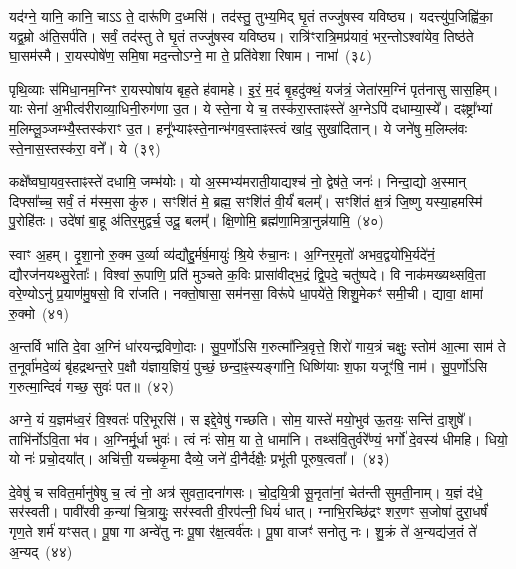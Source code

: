 यद॑ग्ने॒ यानि॒ कानि॒ चाऽऽ ते॒ दारू॑णि द॒ध्मसि॑। तद॑स्तु॒ तुभ्य॒मिद् घृ॒तं तज्जु॑षस्व यविष्ठ्य। यदत्त्यु॑प॒जिह्वि॑का॒ यद्व॒म्रो अ॑ति॒सर्प॑ति। सर्वं॒ तद॑स्तु ते घृ॒तं तज्जु॑षस्व यविष्ठ्य। रात्रि॑ꣳरात्रि॒मप्र॑यावं॒ भर॒न्तो\-ऽश्वा॑येव॒ तिष्ठ॑ते घा॒सम॑स्मै। रा॒यस्पोषे॑ण॒ समि॒षा मद॒न्तो\-ऽग्ने॒ मा ते॒ प्रति॑वेशा रिषाम। नाभा॑~(३८)

पृथि॒व्याः स॑मिधा॒नम॒ग्निꣳ रा॒यस्पोषा॑य बृह॒ते ह॑वामहे। इ॒रं॒ म॒दं बृ॒हदु॑क्थं॒ यज॑त्रं॒ जेता॑रम॒ग्निं पृत॑नासु सास॒हिम्। याः सेना॑ अ॒भीत्व॑रीराव्या॒धिनी॒रुग॑णा उ॒त। ये स्ते॒ना ये च॒ तस्क॑रा॒स्ताꣴस्ते॑ अ॒ग्ने\-ऽपि॑ दधाम्या॒स्ये᳚। दꣴष्ट्रा᳚भ्यां म॒लिम्लू॒ञ्जम्भ्यै॒स्तस्क॑राꣳ उ॒त। हनू᳚भ्याꣴस्ते॒नान्भ॑गव॒स्ताꣴस्त्वं खा॑द॒ सुखा॑दितान्। ये जने॑षु म॒लिम्ल॑वः स्ते॒नास॒स्तस्क॑रा॒ वने᳚। ये~(३९)

कक्षे᳚ष्वघा॒यव॒स्ताꣴस्ते॑ दधामि॒ जम्भ॑योः। यो अ॒स्मभ्य॑मरा\-ती॒याद्यश्च॑ नो॒ द्वेष॑ते॒ जनः॑। निन्दा॒द्यो अ॒स्मान् दिफ्सा᳚च्च॒ सर्वं॒ तं म॑स्म॒सा कु॑रु। सꣳशि॑तं मे॒ ब्रह्म॒ सꣳशि॑तं वी॒र्यं॑ बलम्᳚। सꣳशि॑तं क्ष॒त्रं जि॒ष्णु यस्या॒हमस्मि॑ पु॒रोहि॑तः। उदे॑षां बा॒हू अ॑तिर॒मुद्वर्च॒ उदू॒ बलम्᳚। क्षि॒णोमि॒ ब्रह्म॑णा॒मित्रा॒नुन्न॑यामि॒~(४०)

स्वाꣳ अ॒हम्। दृ॒शा॒नो रु॒क्म उ॒र्व्या व्य॑द्यौद्दु॒र्मर्\mbox{}ष॒मायुः॑ श्रि॒ये रु॑चा॒नः। अ॒ग्निर॒मृतो॑ अभव॒द्वयो॑भि॒र्यदे॑नं॒ द्यौरज॑नयथ्सु॒रेताः᳚। विश्वा॑ रू॒पाणि॒ प्रति॑ मुञ्चते क॒विः प्रासा॑वीद्भ॒द्रं द्वि॒पदे॒ चतु॑ष्पदे। वि नाक॑मख्यथ्सवि॒ता वरे॒ण्यो\-ऽनु॑ प्र॒याण॑मु॒षसो॒ वि रा॑जति। नक्तो॒षासा॒ सम॑नसा॒ विरू॑पे धा॒पये॑ते॒ शिशु॒मेकꣳ॑ समी॒ची। द्यावा॒ क्षामा॑ रु॒क्मो~(४१)

अ॒न्तर्वि भा॑ति दे॒वा अ॒ग्निं धा॑रयन्द्रविणो॒दाः। सु॒प॒र्णो॑\-ऽसि ग॒रुत्मा᳚न्त्रि॒वृत्ते॒ शिरो॑ गाय॒त्रं चक्षुः॒ स्तोम॑ आ॒त्मा साम॑ ते त॒नूर्वा॑मदे॒व्यं बृ॑हद्रथन्त॒रे प॒क्षौ य॑ज्ञाय॒ज्ञियं॒ पुच्छं॒ छन्दा॒ꣴ॒स्यङ्गा॑नि॒ धिष्णि॑याः श॒फा यजूꣳ॑षि॒ नाम॑। सु॒प॒र्णो॑\-ऽसि ग॒रुत्मा॒न्दिवं॑ गच्छ॒ सुवः॑ पत॥~(४२)

{\anuvakamend[{नाभा॒ वने॒ येन॑ यामि॒ क्षामा॑ रु॒क्मो᳚\-ऽष्टात्रिꣳ॑शच्च}]}%

अग्ने॒ यं य॒ज्ञम॑ध्व॒रं वि॒श्वतः॑ परि॒भूरसि॑। स इद्दे॒वेषु॑ गच्छति। सोम॒ यास्ते॑ मयो॒भुव॑ ऊ॒तयः॒ सन्ति॑ दा॒शुषे᳚। ताभि॑र्नो\-ऽवि॒ता भ॑व। अ॒ग्निर्मू॒र्धा भुवः॑। त्वं नः॑ सोम॒ या ते॒ धामा॑नि। तथ्स॑वि॒तुर्वरे᳚ण्यं॒ भर्गो॑ दे॒वस्य॑ धीमहि। धियो॒ यो नः॑ प्रचो॒दया᳚त्। अचि॑त्ती॒ यच्च॑कृ॒मा दैव्ये॒ जने॑ दी॒नैर्दक्षैः॒ प्रभू॑ती पूरुष॒त्वता᳚।~(४३)

दे॒वेषु॑ च सवित॒र्मानु॑षेषु च॒ त्वं नो॒ अत्र॑ सुवता॒दना॑गसः। चो॒द॒यि॒त्री सू॒नृता॑नां॒ चेत॑न्ती सुमती॒नाम्। य॒ज्ञं द॑धे॒ सर॑स्वती। पावी॑रवी क॒न्या॑ चि॒त्रायुः॒ सर॑स्वती वी॒रप॑त्नी॒ धियं॑ धात्। ग्नाभि॒रच्छि॑द्रꣳ शर॒णꣳ स॒जोषा॑ दुरा॒धर्\mbox{}षं॑ गृण॒ते शर्म॑ यꣳसत्। पू॒षा गा अन्वे॑तु नः पू॒षा र॑क्ष॒त्वर्व॑तः। पू॒षा वाजꣳ॑ सनोतु नः। शु॒क्रं ते॑ अ॒न्यद्य॑ज॒तं ते॑ अ॒न्यद्~(४४)

